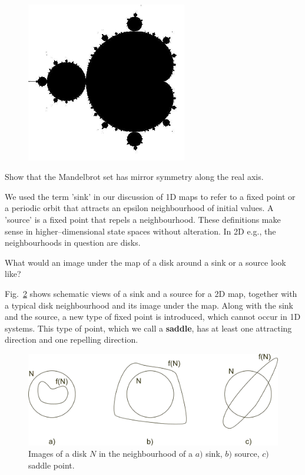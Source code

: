 \begin{figure}
\centering
\includegraphics[width=7cm]{dynamic/figures/mandelbrot}
\label{fig-mandelbrot}
\end{figure} 


\begin{exer}
Show that the Mandelbrot set has mirror symmetry along the real axis.
\end{exer}

\pagebreak


We used the term 'sink' in our discussion of 1D maps to refer to a fixed point or a periodic orbit that attracts an epsilon neighbourhood of initial values. A 'source' is a fixed point that repels a neighbourhood. These definitions make sense in higher--dimensional state spaces without alteration. In 2D e.g., the neighbourhoods in question are disks.

\begin{cue}
What would an image under the map of a disk around a sink or a source look like?  
\end{cue}

Fig.~\ref{fig-circle-images} shows schematic views of a sink and a source for a 2D map, together with a typical disk neighbourhood and its image under the map. Along with the sink and the source, a new type of fixed point is introduced, which cannot occur in 1D systems. This type of point, which we call a \textbf{saddle}, has at least one attracting direction and one repelling direction.

\begin{figure}[h]
\centering
\includegraphics{dynamic/figures/circle_images}
\caption{Images of a disk $N$ in the neighbourhood of a $a)$ sink, $b)$ source, $c)$ saddle point.}
\label{fig-circle-images}
\end{figure} 

